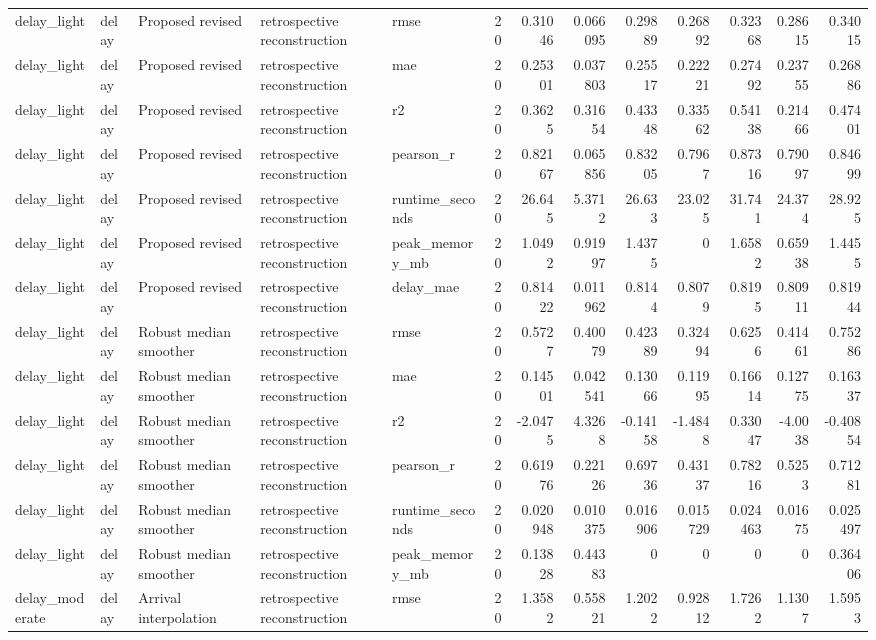 \begin{table}[!htbp]
{{\begin{tabular}{lllllrrrrrrrr}
delay_light & delay & Proposed revised & retrospective reconstruction & rmse & 20 & 0.31046 & 0.066095 & 0.29889 & 0.26892 & 0.32368 & 0.28615 & 0.34015 \\
delay_light & delay & Proposed revised & retrospective reconstruction & mae & 20 & 0.25301 & 0.037803 & 0.25517 & 0.22221 & 0.27492 & 0.23755 & 0.26886 \\
delay_light & delay & Proposed revised & retrospective reconstruction & r2 & 20 & 0.3625 & 0.31654 & 0.43348 & 0.33562 & 0.54138 & 0.21466 & 0.47401 \\
delay_light & delay & Proposed revised & retrospective reconstruction & pearson_r & 20 & 0.82167 & 0.065856 & 0.83205 & 0.7967 & 0.87316 & 0.79097 & 0.84699 \\
delay_light & delay & Proposed revised & retrospective reconstruction & runtime_seconds & 20 & 26.645 & 5.3712 & 26.633 & 23.025 & 31.741 & 24.374 & 28.925 \\
delay_light & delay & Proposed revised & retrospective reconstruction & peak_memory_mb & 20 & 1.0492 & 0.91997 & 1.4375 & 0 & 1.6582 & 0.65938 & 1.4455 \\
delay_light & delay & Proposed revised & retrospective reconstruction & delay_mae & 20 & 0.81422 & 0.011962 & 0.8144 & 0.8079 & 0.8195 & 0.80911 & 0.81944 \\
delay_light & delay & Robust median smoother & retrospective reconstruction & rmse & 20 & 0.5727 & 0.40079 & 0.42389 & 0.32494 & 0.6256 & 0.41461 & 0.75286 \\
delay_light & delay & Robust median smoother & retrospective reconstruction & mae & 20 & 0.14501 & 0.042541 & 0.13066 & 0.11995 & 0.16614 & 0.12775 & 0.16337 \\
delay_light & delay & Robust median smoother & retrospective reconstruction & r2 & 20 & -2.0475 & 4.3268 & -0.14158 & -1.4848 & 0.33047 & -4.0038 & -0.40854 \\
delay_light & delay & Robust median smoother & retrospective reconstruction & pearson_r & 20 & 0.61976 & 0.22126 & 0.69736 & 0.43137 & 0.78216 & 0.5253 & 0.71281 \\
delay_light & delay & Robust median smoother & retrospective reconstruction & runtime_seconds & 20 & 0.020948 & 0.010375 & 0.016906 & 0.015729 & 0.024463 & 0.01675 & 0.025497 \\
delay_light & delay & Robust median smoother & retrospective reconstruction & peak_memory_mb & 20 & 0.13828 & 0.44383 & 0 & 0 & 0 & 0 & 0.36406 \\
delay_moderate & delay & Arrival interpolation & retrospective reconstruction & rmse & 20 & 1.3582 & 0.55821 & 1.2022 & 0.92812 & 1.7262 & 1.1307 & 1.5953 \\

\end{tabular}}}
\end{table}
